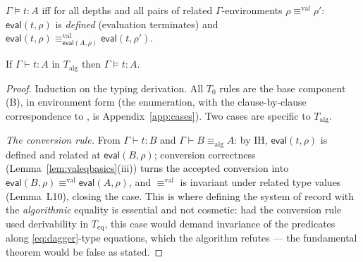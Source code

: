 \documentclass{lmcs}
\newcommand{\aconv}{\equiv_{\mathrm{alg}}}
\newcommand{\valeq}{\equiv^{\mathrm{val}}}
\newcommand{\evalop}{\mathsf{eval}}
\begin{document}
\begin{defi}\label{def:semtyping}
  $\Gamma \vDash t : A$ iff for all depths and all pairs of related
  $\Gamma$-environments $\rho \valeq \rho'$: $\evalop(t, \rho)$ is
  \emph{defined} (evaluation terminates) and
  $\evalop(t, \rho) \valeq_{\evalop(A,\rho)} \evalop(t, \rho')$.
\end{defi}

\begin{thm}\label{thm:fundamental}
  If $\Gamma \vdash t : A$ in $T_{\mathrm{alg}}$ then
  $\Gamma \vDash t : A$.
\end{thm}
\begin{proof}
  Induction on the typing derivation.  All $T_0$ rules are the base
  component (B), in environment form (the enumeration, with the
  clause-by-clause correspondence to \cite{HuberNorm}, is
  Appendix~\ref{app:cases}).  Two cases are specific to
  $T_{\mathrm{alg}}$.

  \emph{The conversion rule.}  From $\Gamma \vdash t : B$ and
  $\Gamma \vdash B \aconv A$: by IH, $\evalop(t,\rho)$ is defined and
  related at $\evalop(B,\rho)$; conversion correctness
  (Lemma~\ref{lem:valeqbasics}(iii)) turns the accepted conversion
  into $\evalop(B,\rho) \valeq \evalop(A,\rho)$, and $\valeq$ is
  invariant under related type values (Lemma~L10), closing the case.
  This is where defining the system of record with the
  \emph{algorithmic} equality is essential and not cosmetic: had the
  conversion rule used derivability in $T_{\mathrm{eq}}$, this case
  would demand invariance of the predicates along
  \eqref{eq:dagger}-type equations, which the algorithm refutes ---
  the fundamental theorem would be false as stated.


\end{proof}
\end{document}
